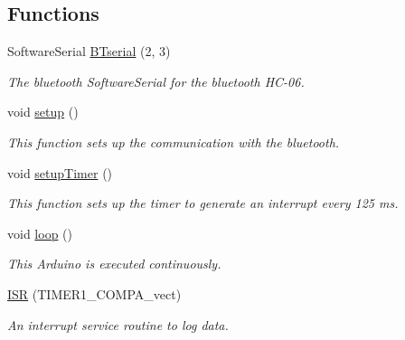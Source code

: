 \subsection*{Functions}
\begin{DoxyCompactItemize}
\item 
Software\-Serial \hyperlink{_grijpersensor_8ino_a3c52699dba2d8c69c28988fc841c1c3e}{B\-Tserial} (2, 3)
\begin{DoxyCompactList}\small\item\em The bluetooth Software\-Serial for the bluetooth H\-C-\/06. \end{DoxyCompactList}\item 
\hypertarget{_grijpersensor_8ino_a4fc01d736fe50cf5b977f755b675f11d}{void \hyperlink{_grijpersensor_8ino_a4fc01d736fe50cf5b977f755b675f11d}{setup} ()}\label{_grijpersensor_8ino_a4fc01d736fe50cf5b977f755b675f11d}

\begin{DoxyCompactList}\small\item\em This function sets up the communication with the bluetooth. \end{DoxyCompactList}\item 
void \hyperlink{_grijpersensor_8ino_a9745f35ca229658cc342286ea75c0b77}{setup\-Timer} ()
\begin{DoxyCompactList}\small\item\em This function sets up the timer to generate an interrupt every 125 ms. \end{DoxyCompactList}\item 
void \hyperlink{_grijpersensor_8ino_afe461d27b9c48d5921c00d521181f12f}{loop} ()
\begin{DoxyCompactList}\small\item\em This Arduino is executed continuously. \end{DoxyCompactList}\item 
\hyperlink{_grijpersensor_8ino_ad39420cdd896dd12c68e36313139d0a5}{I\-S\-R} (T\-I\-M\-E\-R1\-\_\-\-C\-O\-M\-P\-A\-\_\-vect)
\begin{DoxyCompactList}\small\item\em An interrupt service routine to log data. \end{DoxyCompactList}\end{DoxyCompactItemize}
